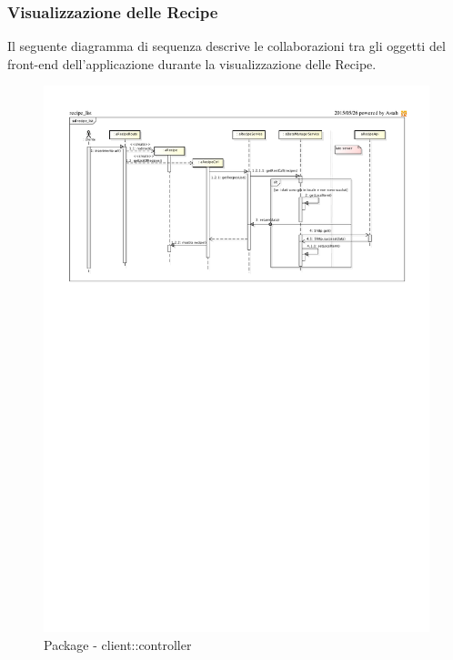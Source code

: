 	\subsubsection{Visualizzazione delle Recipe} %
	\label{ssub:visualizzazione_delle_recipe}
	Il seguente diagramma di sequenza descrive le collaborazioni tra gli oggetti del front-end dell'applicazione durante la visualizzazione delle Recipe. \newline

\begin{figure}[htbp]
	\centering
	\centerline{\includegraphics[scale=1.03]{./images/sequence_diagram/client_view_recipe.pdf}}
	\caption{Package - client::controller}
\end{figure}

	

